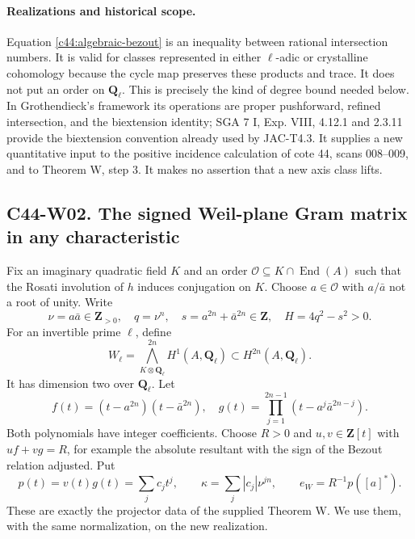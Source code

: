 \documentclass[11pt]{article}
\theoremstyle{remark}\newtheorem{remark}[theorem]{Remark}
\begin{document}
\paragraph{Realizations and historical scope.}
Equation \eqref{c44:algebraic-bezout} is an inequality between rational
intersection numbers.  It is valid for classes represented in either
$\ell$-adic or crystalline cohomology because the cycle map preserves
these products and trace.  It does not put an order on $\mathbf Q_\ell$.
This is precisely the kind of degree bound needed below.  In
Grothendieck's framework its operations are proper pushforward, refined
intersection, and the biextension identity; SGA 7 I, Exp. VIII,
4.12.1 and 2.3.11 provide the biextension convention already used by
JAC-T4.3.  It supplies a new quantitative input to the positive
incidence calculation of cote 44, scans 008--009, and to Theorem W,
step 3.  It makes no assertion that a new axis class lifts.

\subsection*{C44-W02. The signed Weil-plane Gram matrix in any characteristic}

Fix an imaginary quadratic field $K$ and an order
$\mathcal O\subseteq K\cap\operatorname{End}(A)$ such that the Rosati
involution of $h$ induces conjugation on $K$.  Choose
$a\in\mathcal O$ with $a/\bar a$ not a root of unity.  Write
\[
 \nu=a\bar a\in\mathbf Z_{>0},\quad q=\nu^n,\quad
 s=a^{2n}+\bar a^{2n}\in\mathbf Z,\quad H=4q^2-s^2>0.
\]
For an invertible prime $\ell$, define
\[
 W_\ell=\bigwedge_{K\otimes\mathbf Q_\ell}^{2n}H^1(A,\mathbf Q_\ell)
 \subset H^{2n}(A,\mathbf Q_\ell).
\]
It has dimension two over $\mathbf Q_\ell$.  Let
\[
 f(t)=(t-a^{2n})(t-\bar a^{2n}),\quad
 g(t)=\prod_{j=1}^{2n-1}(t-a^j\bar a^{2n-j}).
\]
Both polynomials have integer coefficients.  Choose $R>0$ and
$u,v\in\mathbf Z[t]$ with $uf+vg=R$, for example the absolute
resultant with the sign of the Bezout relation adjusted.  Put
\[
 p(t)=v(t)g(t)=\sum_jc_jt^j,\qquad
 \kappa=\sum_j|c_j|\nu^{jn},\qquad e_W=R^{-1}p([a]^*).
\]
These are exactly the projector data of the supplied Theorem W.
We use them, with the same normalization, on the new realization.
\end{document}
